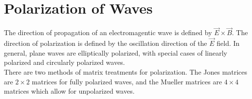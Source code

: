 \documentclass[11pt]{book}
\theoremstyle{break}
\theoremstyle{break}
\begin{document}
\chapter{Polarization of Waves}
The direction of propagation of an electromagentic wave is defined by $\vec{E}\times \vec{B}$. The direction of polarization is defined by the oscillation direction of the $\vec{E}$ field. In general, plane waves are elliptically polarized, with special cases of linearly polarized and circularly polarized waves. \\

There are two methods of matrix treatments for polarization. The Jones matrices are $2\times 2$ matrices for fully polarized waves, and the Mueller matrices are $4\times 4$ matrices which allow for unpolarized waves.\\
\end{document}
